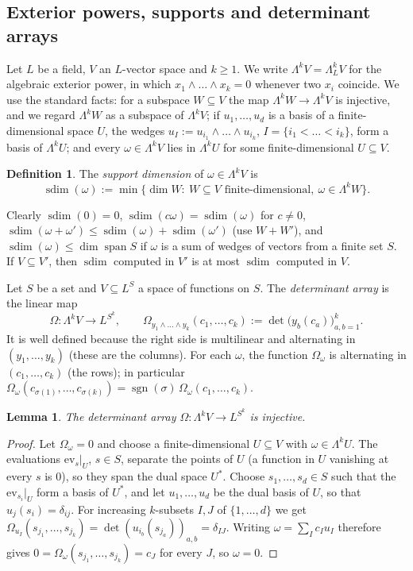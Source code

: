 \documentclass[11pt]{amsart}
\newtheorem{lemma}[theorem]{Lemma}
\theoremstyle{definition}
\newtheorem{definition}[theorem]{Definition}
\theoremstyle{remark}
\numberwithin{equation}{section}
\newcommand{\sgn}{\operatorname{sgn}}
\newcommand{\spn}{\operatorname{span}}
\newcommand{\sdim}{\operatorname{sdim}}
\begin{document}
\subsection{Exterior powers, supports and determinant arrays}\label{ssec:ext}
Let $L$ be a field, $V$ an $L$\nobreakdash-vector space and $k\ge1$. We write $\Lambda^kV=\Lambda^k_LV$ for the algebraic exterior
power, in which $x_1\wedge\dots\wedge x_k=0$ whenever two $x_i$ coincide. We use the standard facts: for a subspace
$W\subseteq V$ the map $\Lambda^kW\to\Lambda^kV$ is injective, and we regard $\Lambda^kW$ as a subspace of $\Lambda^kV$;
if $u_1,\dots,u_d$ is a basis of a finite-dimensional space $U$, the wedges $u_I:=u_{i_1}\wedge\dots\wedge u_{i_k}$,
$I=\{i_1<\dots<i_k\}$, form a basis of $\Lambda^kU$; and every $\omega\in\Lambda^kV$ lies in $\Lambda^kU$ for some
finite-dimensional $U\subseteq V$.

\begin{definition}\label{def:supp}
The \emph{support dimension} of $\omega\in\Lambda^kV$ is
\[
\sdim(\omega):=\min\{\dim W:\ W\subseteq V\text{ finite-dimensional},\ \omega\in\Lambda^kW\}.
\]
\end{definition}

Clearly $\sdim(0)=0$, $\sdim(c\omega)=\sdim(\omega)$ for $c\neq0$, $\sdim(\omega+\omega')\le\sdim(\omega)+\sdim(\omega')$
(use $W+W'$), and $\sdim(\omega)\le\dim\spn S$ if $\omega$ is a sum of wedges of vectors from a finite set $S$. If
$V\subseteq V'$, then $\sdim$ computed in $V'$ is at most $\sdim$ computed in $V$.

Let $S$ be a set and $V\subseteq L^S$ a space of functions on $S$. The \emph{determinant array} is the linear map
\[
\Omega\colon\Lambda^kV\to L^{S^k},\qquad \Omega_{y_1\wedge\dots\wedge y_k}(c_1,\dots,c_k):=\det\bigl(y_b(c_a)\bigr)_{a,b=1}^k .
\]
It is well defined because the right side is multilinear and alternating in $(y_1,\dots,y_k)$ (these are the
columns). For each $\omega$, the function $\Omega_\omega$ is alternating in $(c_1,\dots,c_k)$ (the rows); in particular
$\Omega_\omega(c_{\sigma(1)},\dots,c_{\sigma(k)})=\sgn(\sigma)\,\Omega_\omega(c_1,\dots,c_k)$.

\begin{lemma}\label{lem:detinj}
The determinant array $\Omega\colon\Lambda^kV\to L^{S^k}$ is injective.
\end{lemma}

\begin{proof}
Let $\Omega_\omega=0$ and choose a finite-dimensional $U\subseteq V$ with $\omega\in\Lambda^kU$. The evaluations
$\mathrm{ev}_s|_U$, $s\in S$, separate the points of $U$ (a function in $U$ vanishing at every $s$ is $0$), so they span
the dual space $U^*$. Choose $s_1,\dots,s_d\in S$ such that the $\mathrm{ev}_{s_i}|_U$ form a basis of $U^*$, and let
$u_1,\dots,u_d$ be the dual basis of $U$, so that $u_j(s_i)=\delta_{ij}$. For increasing $k$\nobreakdash-subsets $I,J$ of
$\{1,\dots,d\}$ we get $\Omega_{u_I}(s_{j_1},\dots,s_{j_k})=\det(u_{i_b}(s_{j_a}))_{a,b}=\delta_{IJ}$. Writing
$\omega=\sum_Ic_Iu_I$ therefore gives $0=\Omega_\omega(s_{j_1},\dots,s_{j_k})=c_J$ for every $J$, so $\omega=0$.
\end{proof}
\end{document}
